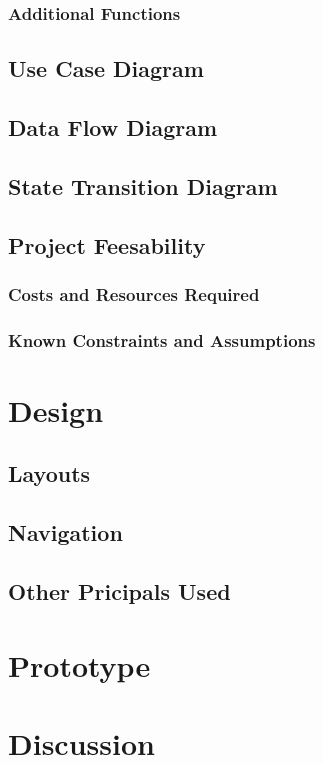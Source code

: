 \documentclass[12pt]{article}
\begin{document}
\subsubsection{Additional Functions}
\subsection{Use Case Diagram}
\subsection{Data Flow Diagram}
\subsection{State Transition Diagram}
\subsection{Project Feesability}
\subsubsection{Costs and Resources Required}
\subsubsection{Known Constraints and Assumptions}

\section{Design}
\subsection{Layouts}
\subsection{Navigation}
\subsection{Other Pricipals Used}

\section{Prototype}

\section{Discussion}
\end{document}
